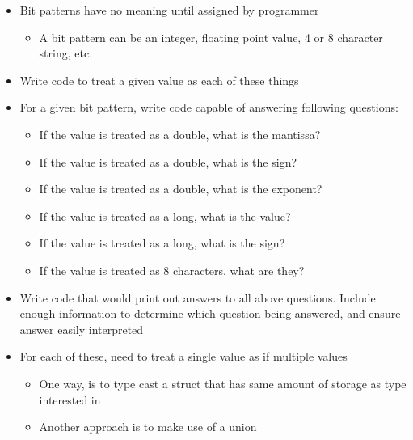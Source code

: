 \documentclass[letterpaper,10pt,onecolumn]{IEEEtran}
\begin{document}
\begin{itemize}
	\item Bit patterns have no meaning until assigned by programmer
		\begin{itemize}
			\item A bit pattern can be an integer, floating point value, 4 or 8 character string, etc.
		\end{itemize}
	\item Write code to treat a given value as each of these things
	\item For a given bit pattern, write code capable of answering following questions:
		\begin{itemize}
			\item If the value is treated as a double, what is the mantissa?
			\item If the value is treated as a double, what is the sign?
			\item If the value is treated as a double, what is the exponent?
			\item If the value is treated as a long, what is the value?
			\item If the value is treated as a long, what is the sign?
			\item If the value is treated as 8 characters, what are they?
		\end{itemize}
	\item Write code that would print out answers to all above questions. Include enough information to determine which question being answered, and ensure answer easily interpreted
	\item For each of these, need to treat a single value as if multiple values
		\begin{itemize}
			\item One way, is to type cast a struct that has same amount of storage as type interested in
			\item Another approach is to make use of a union
		\end{itemize}
\end{itemize}

\iffalse
\newpage

\begin{thebibliography}{1}

\bibitem{first}
F. Author. (year). 
\textit{title} 
. [Online]. Available: 
\\\url{url}

\end{thebibliography}
\fi
\end{document}
